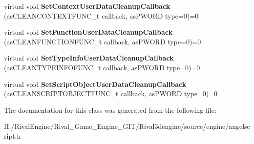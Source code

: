 \begin{DoxyCompactItemize}
$$virtual void {\bfseries Set\+Context\+User\+Data\+Cleanup\+Callback} (as\+C\+L\+E\+A\+N\+C\+O\+N\+T\+E\+X\+T\+F\+U\+N\+C\+\_\+t callback, as\+P\+W\+O\+RD type=0)=0
\item 
\mbox{\label{classas_i_script_engine_ae75ee087fe6608cf0af1c24794ca73c7}} 
virtual void {\bfseries Set\+Function\+User\+Data\+Cleanup\+Callback} (as\+C\+L\+E\+A\+N\+F\+U\+N\+C\+T\+I\+O\+N\+F\+U\+N\+C\+\_\+t callback, as\+P\+W\+O\+RD type=0)=0
\item 
\mbox{\label{classas_i_script_engine_afa31e7c28c63a2c876d8e08305cf5d75}} 
virtual void {\bfseries Set\+Type\+Info\+User\+Data\+Cleanup\+Callback} (as\+C\+L\+E\+A\+N\+T\+Y\+P\+E\+I\+N\+F\+O\+F\+U\+N\+C\+\_\+t callback, as\+P\+W\+O\+RD type=0)=0
\item 
\mbox{\label{classas_i_script_engine_a4654e2cae0690c50e19b177f1ec54592}} 
virtual void {\bfseries Set\+Script\+Object\+User\+Data\+Cleanup\+Callback} (as\+C\+L\+E\+A\+N\+S\+C\+R\+I\+P\+T\+O\+B\+J\+E\+C\+T\+F\+U\+N\+C\+\_\+t callback, as\+P\+W\+O\+RD type=0)=0
\end{DoxyCompactItemize}


The documentation for this class was generated from the following file\+:\begin{DoxyCompactItemize}
\item 
H\+:/\+Rival\+Engine/\+Rival\+\_\+\+Game\+\_\+\+Engine\+\_\+\+G\+I\+T/\+Rival3dengine/source/engine/angelscript.\+h\end{DoxyCompactItemize}
